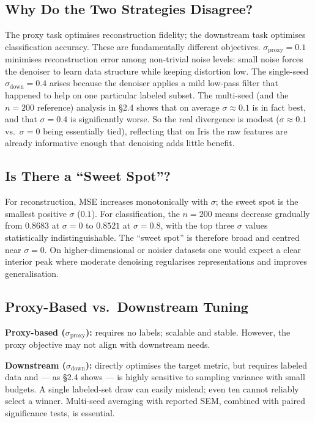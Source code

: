 \documentclass[11pt]{article}
\begin{document}
\subsection{Why Do the Two Strategies Disagree?}
The proxy task optimises reconstruction fidelity; the downstream task
optimises classification accuracy. These are fundamentally different
objectives. $\sigma_{\text{proxy}}{=}0.1$ minimises reconstruction error among
non-trivial noise levels: small noise forces the denoiser to learn data
structure while keeping distortion low. The single-seed
$\sigma_{\text{down}}{=}0.4$ arises because the denoiser applies a mild
low-pass filter that happened to help on one particular labeled subset. The
multi-seed (and the $n{=}200$ reference) analysis in \S2.4 shows that on
average $\sigma \approx 0.1$ is in fact best, and that $\sigma{=}0.4$ is
significantly worse. So the real divergence is modest
($\sigma \approx 0.1$ vs.\ $\sigma{=}0$ being essentially tied), reflecting
that on Iris the raw features are already informative enough that denoising
adds little benefit.

\subsection{Is There a ``Sweet Spot''?}
For reconstruction, MSE increases monotonically with $\sigma$; the sweet spot
is the smallest positive $\sigma$ ($0.1$). For classification, the $n{=}200$
means decrease gradually from $0.8683$ at $\sigma{=}0$ to $0.8521$ at
$\sigma{=}0.8$, with the top three $\sigma$ values statistically
indistinguishable. The ``sweet spot'' is therefore broad and centred near
$\sigma{=}0$. On higher-dimensional or noisier datasets one would expect a
clear interior peak where moderate denoising regularises representations and
improves generalisation.

\subsection{Proxy-Based vs.\ Downstream Tuning}
\textbf{Proxy-based ($\sigma_{\text{proxy}}$):} requires no labels; scalable
and stable. However, the proxy objective may not align with downstream needs.

\textbf{Downstream ($\sigma_{\text{down}}$):} directly optimises the target
metric, but requires labeled data and --- as \S2.4 shows --- is highly
sensitive to sampling variance with small budgets. A single labeled-set draw
can easily mislead; even ten cannot reliably select a winner. Multi-seed
averaging with reported SEM, combined with paired significance tests, is
essential.
\end{document}
